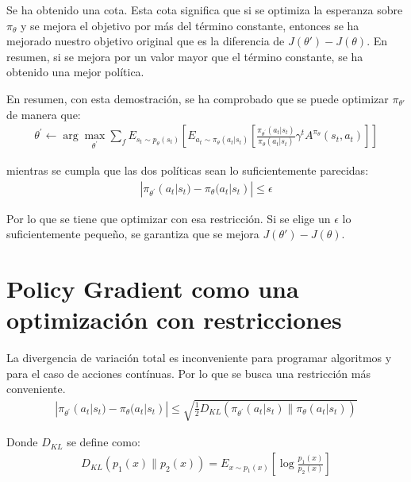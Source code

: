 Se ha obtenido una cota. Esta cota significa que si se optimiza la esperanza sobre $\pi_\theta$ y
se mejora el objetivo por más del término constante, entonces se ha mejorado nuestro objetivo
original que es la diferencia de $J(\theta')-J(\theta)$. En resumen, si se mejora por un valor
mayor que el término constante, se ha obtenido una mejor política.

En resumen, con esta demostración, se ha comprobado que se puede optimizar $\pi_{ \theta' }$ de manera
que:
\begin{align}
\theta ^ { \prime } \leftarrow \operatorname { arg } \operatorname { max } _ { \theta ^ { \prime } } \sum _ { f } E _ { s _ { t } \sim p _ { \theta } ( s _ { t } ) } \left[ E _ { a _ { t } \sim \pi _ { \theta } ( a _ { t } | s _ { t } ) } \left[ \frac { \pi _ { \theta ^ { \prime } } ( a _ { t } | s _ { t } ) } { \pi _ { \theta } ( a _ { t } | s _ { t } ) } \gamma ^ { t } A ^ { \pi _ { \theta } } ( s _ { t } , a _ { t } ) \right] \right]
\end{align}

mientras se cumpla que las dos políticas sean lo suficientemente parecidas:
\begin{align}
| \pi _ { \theta ^ { \prime } } ( a _ { t } | s _ { t } ) - \pi _ { \theta } ( a _ { t } | s _ { t } ) | \leq \epsilon
\end{align}

Por lo que se tiene que optimizar con esa restricción. Si se elige un $\epsilon$ lo
suficientemente pequeño, se garantiza que se mejora $J(\theta')-J(\theta)$.

\section{Policy Gradient como una optimización con restricciones}%
\label{sec:policy_gradient_como_una_optimización_con_restricciones}

La divergencia de variación total es inconveniente para programar algoritmos y para el caso de
acciones contínuas. Por lo que se busca una restricción más conveniente.
\begin{align}
| \pi _ { \theta ^ { \prime } } ( a _ { t } | s _ { t } ) - \pi _ { \theta } ( a _ { t } | s _ { t } ) | \leq \sqrt { \frac { 1 } { 2 } D _ { KL } ( \pi _ { \theta ^ { \prime } } ( a _ { t } | s _ { t } ) \| \pi _ { \theta } ( a _ { t } | s _ { t } ) ) }
\end{align}

Donde $D_{KL}$ se define como:
\begin{align}
D _ { KL } ( p _ { 1 } ( x ) \| p _ { 2 } ( x ) ) = E _ { x \sim p _ { 1 } ( x ) } \left[
    \operatorname { log } \frac { p _ { 1 } ( x ) } { p _ { 2 } ( x ) } \right]
\end{align}

